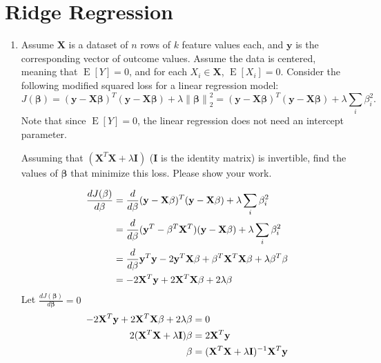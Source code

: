 \documentclass[11pt]{article}
\renewcommand{\vec}[1]{\mathbf{#1}}
\DeclareMathOperator{\E}{E}
\begin{document}
\pagebreak
\section{Ridge Regression}

\newcommand{\norm}[1]{\left\lVert#1\right\rVert}

\begin{enumerate}

\item Assume $\vec{X}$ is a dataset of $n$ rows of $k$ feature values each, and $\vec{y}$ is the corresponding vector of outcome values.
Assume the data is centered, meaning that $\E[Y] = 0$, and for each $X_i \in \vec{X}$, $\E[X_i] = 0$.
Consider the following modified squared loss for a linear regression model:
\begin{equation}
J(\vec{\beta}) = (\vec{y}-\vec{X}\vec{\beta})^T(\vec{y}-\vec{X}\vec{\beta}) + \lambda \norm{\vec{\beta}}_2^2 =
(\vec{y}-\vec{X}\vec{\beta})^T(\vec{y}-\vec{X}\vec{\beta}) + \lambda \sum_i \beta_i^2.
\end{equation}
Note that since $\E[Y] = 0$, the linear regression does not need an intercept parameter.

Assuming that $(\vec{X}^T\vec{X}+\lambda \vec{I})$ ($\vec{I}$ is the identity matrix) is invertible, find the values of $\vec{\beta}$ that minimize this loss.  Please show your work.

\begin{answertext}{10cm}{}

\begin{align}
\frac{dJ(\vec{\beta})}{d\vec{\beta}} &= \frac{d}{d\vec{\beta}} (\vec{y} - \vec{X}\vec{\beta})^{T} (\vec{y} - \vec{X}\vec{\beta}) + \lambda \sum_{i}{\beta_{i}^{2}} \notag\\
&= \frac{d}{d\vec{\beta}} (\vec{y}^{T} - \vec{\beta}^{T}\vec{X}^{T}) (\vec{y} - \vec{X}\vec{\beta}) + \lambda \sum_{i}{\beta_{i}^{2}} \notag\\
&= \frac{d}{d\vec{\beta}} \vec{y}^{T}\vec{y} - 2\vec{y}^{T}\vec{X}\vec{\beta} + \vec{\beta}^{T}\vec{X}^{T}\vec{X}\vec{\beta} + \lambda\vec{\beta}^{T}\vec{\beta} \notag\\
&= -2\vec{X}^{T}\vec{y} + 2\vec{X}^{T}\vec{X}\vec{\beta} + 2\lambda\vec{\beta} \notag
\end{align}
Let $\frac{dJ(\vec{\beta})}{d\vec{\beta}} = 0$ 
\begin{align}
-2\vec{X}^{T}\vec{y} + 2\vec{X}^{T}\vec{X}\vec{\beta} + 2\lambda\vec{\beta} &= 0 \notag\\
2(\vec{X}^{T}\vec{X} + \lambda\vec{I})\vec{\beta} &= 2\vec{X}^{T}\vec{y} \notag\\
\vec{\beta} &= (\vec{X}^{T}\vec{X} + \lambda\vec{I})^{-1} \vec{X}^{T}\vec{y} \notag
\end{align}


\end{answertext}
\end{enumerate}
\end{document}
